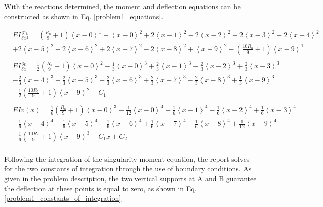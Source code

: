 \documentclass[a4paper]{article}
\begin{document}
With the reactions determined, the moment and deflection equations can be constructed as shown in Eq. \ref{problem1_equations}.

\begin{equation}
    \begin{split}
& EI \frac{\delta^2 v}{\delta x^2} = \left(\frac{R_b}{9} + 1\right)\left<x-0\right>^1 - \left<x-0\right>^2 +  2\left<x-1\right>^2 - 2\left<x-2\right>^2 +  2\left<x-3\right>^2 - 2\left<x-4\right>^2  \\
& +  2\left<x-5\right>^2 - 2\left<x-6\right>^2  +  2\left<x-7\right>^2 - 2\left<x-8\right>^2 + \left <x-9\right>^2 - \left( \frac{10R_b}{9} + 1\right)\left<x-9\right>^1 \\
& \\
& EI \frac{\delta v}{\delta x} =  \frac{1}{2}\left(\frac{R_b}{9} + 1\right)\left<x-0\right>^2 - \frac{1}{3}\left<x-0\right>^3 +  \frac{2}{3}\left<x-1\right>^3 - \frac{2}{3}\left<x-2\right>^3 +  \frac{2}{3}\left<x-3\right>^3  \\
& - \frac{2}{3}\left<x-4\right>^3  +  \frac{2}{3}\left<x-5\right>^3 - \frac{2}{3}\left<x-6\right>^3  +  \frac{2}{3}\left<x-7\right>^3 - \frac{2}{3}\left<x-8\right>^3 +  \frac{1}{3}\left<x-9\right>^3 \\
& - \frac{1}{2}\left( \frac{10R_b}{9} + 1\right)\left<x-9\right>^2  + C_1\\
& \\
& EI v(x) = \frac{1}{6}\left(\frac{R_b}{9} + 1\right)\left<x-0\right>^3 - \frac{1}{12}\left<x-0\right>^4 +  \frac{1}{6}\left<x-1\right>^4 - \frac{1}{6}\left<x-2\right>^4 + \frac{1}{6}\left<x-3\right>^4   \\      
& - \frac{1}{6}\left<x-4\right>^4 +  \frac{1}{6}\left<x-5\right>^4 - \frac{1}{6}\left<x-6\right>^4  +  \frac{1}{6}\left<x-7\right>^4 - \frac{1}{6}\left<x-8\right>^4 +  \frac{1}{12}\left<x-9\right>^4  \\
& - \frac{1}{6}\left( \frac{10R_b}{9} + 1\right)\left<x-9\right>^3 + C_1x + C_2 \\
    \end{split}
\label{problem1_equations}
\end{equation}

Following the integration of the singularity moment equation, the report solves for the two constants of integration through the use of boundary conditions. As given in the problem description, the two vertical supports at A and B guarantee the deflection at these points is equal to zero, as shown in Eq. \ref{problem1_constants_of_integration}
\end{document}
